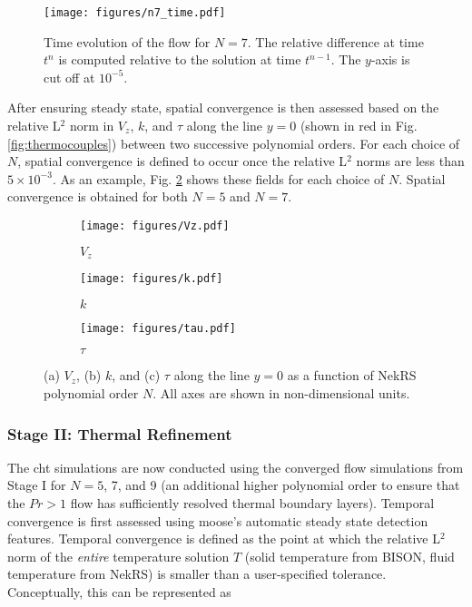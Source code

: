 \documentclass[3p,,preprint,11pt]{elsarticle}
\begin{document}
\begin{figure}[!htb]                                                                                                  
\centering
\texttt{[image: figures/n7\_time.pdf]}
\caption{Time evolution of the flow for $N=7$. The relative difference at time $t^n$ is computed relative to the solution at time $t^{n-1}$. The $y$-axis is cut off at $10^{-5}$.}
\label{fig:n5_steady}
\end{figure}

After ensuring steady state, spatial convergence is then assessed based on the relative L$^2$ norm in $V_z$, $k$, and $\tau$ along the line $y=0$ (shown in red in Fig. \ref{fig:thermocouples}) between two successive polynomial orders. For each choice of $N$, spatial convergence is defined to occur once the relative L$^2$ norms are less than $5\times10^{-3}$. As an example, Fig. \ref{fig:N_convergence} shows these fields for each choice of $N$. Spatial convergence is obtained for both $N=5$ and $N=7$. 

\begin{figure}[!htb]
\centering
\begin{subfigure}{0.3\textwidth}
  \centering
  \texttt{[image: figures/Vz.pdf]}
  \caption{$V_z$}
\end{subfigure}
\begin{subfigure}{0.315\textwidth}
  \centering
  \texttt{[image: figures/k.pdf]}
  \caption{$k$}
\end{subfigure}
\begin{subfigure}{0.3\textwidth}
  \centering
  \texttt{[image: figures/tau.pdf]}
  \caption{$\tau$}
\end{subfigure}
\caption{(a) $V_z$, (b) $k$, and (c) $\tau$ along the line $y=0$ as a function of NekRS polynomial order $N$. All axes are shown in non-dimensional units.}
\label{fig:N_convergence}
\end{figure}

\subsubsection{Stage II: Thermal Refinement}

The \gls{cht} simulations are now conducted using the converged flow simulations from Stage I for $N=5$, 7, and 9 (an additional higher polynomial order to ensure that the $Pr>1$ flow has sufficiently resolved thermal boundary layers). 
Temporal convergence is first assessed using \gls{moose}'s automatic steady state detection features. Temporal convergence is defined as the point at which the relative L$^2$ norm of the {\it entire} temperature solution $T$ 
(solid temperature from BISON, fluid temperature from NekRS) is smaller than a user-specified tolerance. Conceptually, this can be represented as
\end{document}
